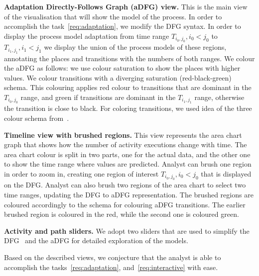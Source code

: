 \textbf{Adaptation Directly-Follows Graph (aDFG) view.} This is the main view of the visualisation that will show the model of the process. In order to accomplish the task~\ref{req:adaptation}, we modify the DFG syntax. In order to display the process model adaptation from time range $T_{i_0,j_0}, i_0<j_0$ to $T_{i_1,j_1}, i_1<j_1$ we display the union of the process models of these regions, annotating the places and transitions with the numbers of both ranges. We colour the aDFG as follows: we use colour saturation to show the places with higher values. We colour transitions with a diverging saturation (red-black-green) schema. This colouring applies red colour to transitions that are dominant in the $T_{i_0,j_0}$ range, and green if transitions are dominant in the $T_{i_1,j_1}$ range, otherwise the transition is close to black. For coloring transitions, we used idea of the three colour schema from~\cite{DBLP:conf/grapp/KriglsteinR12}.

\textbf{Timeline view with brushed regions.} This view represents the area chart graph that shows how the number of activity executions change with time. The area chart colour is split in two parts, one for the actual data, and the other one to show the time range where values are predicted. Analyst can brush one region in order to zoom in, creating one region of interest $T_{i_0,j_0}, i_0<j_0$ that is displayed on the DFG. Analyst can also brush two regions of the area chart to select two time ranges, updating the DFG to aDFG representation. The brushed regions are coloured accordingly to the schema for colouring aDFG transitions. The earlier brushed region is coloured in the red, while the second one is coloured green. 

\textbf{Activity and path sliders.} We adopt two sliders that are used to simplify the DFG~\cite{leemans2019directly} and the aDFG for detailed exploration of the models.

Based on the described views, we conjecture that the analyst is able to accomplish the tasks~\ref{req:adaptation}, and~\ref{req:interactive} with ease.







